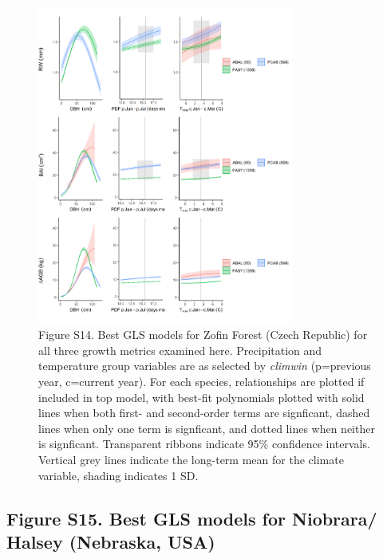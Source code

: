 \documentclass[
]{article}
\begin{document}
\begin{figure}
\centering
\includegraphics[width=0.75\textwidth,height=\textheight]{tables_figures/SI_figures/composite_plots/Zofin.png}
\caption{Figure S14. Best GLS models for Zofin Forest (Czech Republic)
for all three growth metrics examined here. Precipitation and
temperature group variables are as selected by \emph{climwin}
(p=previous year, c=current year). For each species, relationships are
plotted if included in top model, with best-fit polynomials plotted with
solid lines when both first- and second-order terms are signficant,
dashed lines when only one term is signficant, and dotted lines when
neither is signficant. Transparent ribbons indicate 95\% confidence
intervals. Vertical grey lines indicate the long-term mean for the
climate variable, shading indicates 1 SD.}
\end{figure}

\newpage

\hypertarget{figure-s15.-best-gls-models-for-niobrara-halsey-nebraska-usa}{%
\subsection{Figure S15. Best GLS models for Niobrara/ Halsey (Nebraska,
USA)}\label{figure-s15.-best-gls-models-for-niobrara-halsey-nebraska-usa}}
\end{document}

